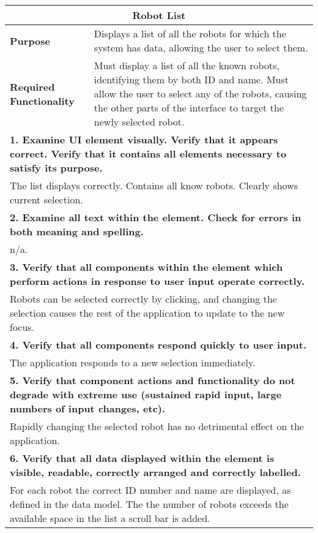\begin{longtable}{ l p{10cm} }
 \hline
 \multicolumn{2}{c}{\textbf{Robot List}}\\
 \hline
 \textbf{Purpose} & Displays a list of all the robots for which the system has data, allowing the user to select them.\\
 \textbf{Required Functionality} & Must display a list of all the known robots, identifying them by both ID and name. Must allow the user to select any of the robots, causing the other parts of the interface to target the newly selected robot.\\
 \hline
 \multicolumn{2}{p{14cm}}{\textbf{1. Examine UI element visually. Verify that it appears correct. Verify that it contains all elements necessary to satisfy its purpose.}}\\
 \multicolumn{2}{p{14cm}}{The list displays correctly. Contains all know robots. Clearly shows current selection.}\\
 \hline
 \multicolumn{2}{p{14cm}}{\textbf{2. Examine all text within the element. Check for errors in both meaning and spelling.}}\\
 \multicolumn{2}{p{14cm}}{n/a.}\\
 \hline
 \multicolumn{2}{p{14cm}}{\textbf{3. Verify that all components within the element which perform actions in response to user input operate correctly.}}\\
 \multicolumn{2}{p{14cm}}{Robots can be selected correctly by clicking, and changing the selection causes the rest of the application to update to the new focus.}\\
 \hline
 \multicolumn{2}{p{14cm}}{\textbf{4. Verify that all components respond quickly to user input.}}\\
 \multicolumn{2}{p{14cm}}{The application responds to a new selection immediately.}\\
 \hline
 \multicolumn{2}{p{14cm}}{\textbf{5. Verify that component actions and functionality do not degrade with extreme use (sustained rapid input, large numbers of input changes, etc).}}\\
 \multicolumn{2}{p{14cm}}{Rapidly changing the selected robot has no detrimental effect on the application.}\\
 \hline
 \multicolumn{2}{p{14cm}}{\textbf{6. Verify that all data displayed within the element is visible, readable, correctly arranged and correctly labelled.}}\\
 \multicolumn{2}{p{14cm}}{For each robot the correct ID number and name are displayed, as defined in the data model. The the number of robots exceeds the available space in the list a scroll bar is added.}\\

\end{longtable}
